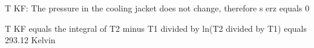 T KF: The pressure in the cooling jacket does not change, therefore s erz equals 0  

T KF equals the integral of T2 minus T1 divided by ln(T2 divided by T1)  
equals 293.12 Kelvin